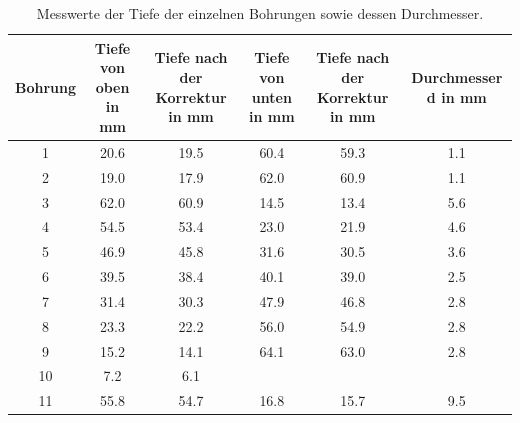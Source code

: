 \begin{table}
    \centering 
    \caption{Messwerte der Tiefe der einzelnen Bohrungen sowie dessen Durchmesser.}
\begin{tabular}{c c c c c c}
    \toprule
    Bohrung & Tiefe von oben in \unit{\mm} & Tiefe nach der Korrektur in \unit{\mm}& Tiefe von unten in \unit{\mm} & Tiefe nach der Korrektur in \unit{\mm} & Durchmesser d in \unit{\mm}\\
    \midrule
                        1&20.6&19.5&60.4&59.3&1.1 \\
                         2&19.0&17.9&62.0&60.9&1.1 \\
                         3&62.0&60.9&14.5&13.4&5.6 \\
                         4&54.5&53.4&23.0&21.9&4.6 \\
                         5&46.9&45.8&31.6&30.5&3.6 \\
                         6&39.5&38.4&40.1&39.0&2.5 \\
                         7&31.4&30.3&47.9&46.8&2.8 \\
                         8&23.3&22.2&56.0&54.9&2.8 \\
                         9&15.2&14.1&64.1&63.0&2.8 \\
                                     10&7.2&6.1&&& \\
                        11&55.8&54.7&16.8&15.7&9.5 \\
                        \bottomrule
    \end{tabular}
    \label{tab:AScan}
\end{table}